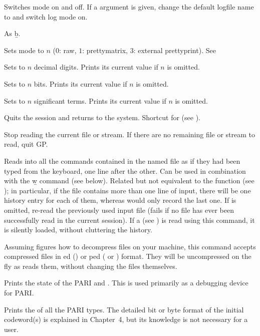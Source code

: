  Switches  mode on and off.
If a  argument is given, change the default logfile name to
 and switch log mode on.

 As \b{b}.

 Sets  mode to $n$ ($0$: raw, $1$:
prettymatrix, $3$: external prettyprint). See 

 Sets  to $n$ decimal digits.
Prints its current value if $n$ is omitted.

 Sets  to $n$ bits.
Prints its current value if $n$ is omitted.

 Sets  to $n$ significant terms.
Prints its current value if $n$ is omitted.

 Quits the  session and returns to the system.
Shortcut for \kbd{()} (see ).

 Stop reading the current  file or stream. If there are
no remaining file or stream to read, quit GP.

 Reads into  all the
commands contained in the named file as if they had been typed from the
keyboard, one line after the other. Can be used in combination with the \b{w}
command (see below). Related but not equivalent to the function 
(see ); in particular, if the file contains more than one
line of input, there will be one history entry for each of them, whereas
 would only record the last one. If  is omitted,
re-read the previously used input file (fails if no file has ever been
successfully read in the current session). If a  
(see ) is read using this command, it is silently loaded,
without cluttering the history.

Assuming  figures how to decompress files on your machine, this
command accepts compressed files in ed () or
ped ( or ) format. They will be uncompressed on
the fly as  reads them, without changing the files themselves.

 Prints the state of the PARI  and .
This is used primarily as a debugging device for PARI.

 Prints the  of all the PARI
types. The detailed bit or byte format of the initial codeword(s) is
explained in Chapter~4, but its knowledge is not necessary for a 
user.

